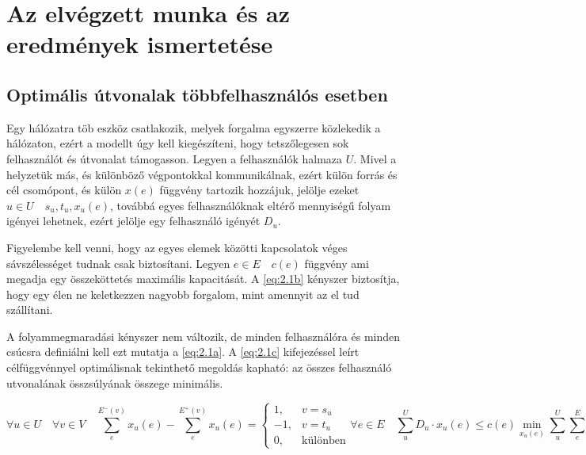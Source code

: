 \documentclass[a4paper,oneside]{article}
\newcommand{\inedge}[1]{E^-(#1)}
\newcommand{\outedge}[1]{E^+(#1)}
\begin{document}
\section{Az elvégzett munka és az eredmények ismertetése}
\label{sec:az-elvegzett-munka}

\subsection{Optimális útvonalak többfelhasználós esetben}
\label{sec:multiuser}

Egy hálózatra töb eszköz csatlakozik, melyek forgalma egyszerre közlekedik a hálózaton, ezért
a modellt úgy kell kiegészíteni, hogy tetszőlegesen sok felhasználót és útvonalat támogasson.
Legyen a felhasználók halmaza $U$.
Mivel a helyzetük más, és különböző végpontokkal kommunikálnak, ezért külön forrás és cél csomópont, 
és külön $x(e)$ függvény tartozik hozzájuk, jelölje ezeket $u \in U \quad s_u, t_u, x_u(e)$,
továbbá egyes felhasználóknak eltérő mennyiségű folyam igényei lehetnek,
ezért jelölje egy felhasználó igényét $D_u$.

Figyelembe kell venni, hogy az egyes elemek közötti kapcsolatok véges sávszélességet tudnak csak biztosítani.
Legyen $e \in E \quad c(e)$ függvény ami megadja egy összeköttetés maximális kapacitását.
A \eqref{eq:2.1b} kényszer biztosítja, hogy egy élen ne keletkezzen nagyobb forgalom, mint amennyit az el tud szállítani.

A folyammegmaradási kényszer nem változik, de minden felhasználóra és minden csúcsra definiálni kell ezt mutatja a \eqref{eq:2.1a}.
A \eqref{eq:2.1c} kifejezéssel leírt célfüggvénnyel optimálisnak tekinthető megoldás kapható:
az összes felhasználó utvonalának összsúlyának összege minimális.

\begin{subequations}
  \begin{equation}
    \forall u \in U \quad \forall v \in V \quad \sum_{e}^{\inedge{v}}x_u(e) - \sum_{e}^{\outedge{v}}x_u(e) = \begin{cases}
      1, & v = s_u \\
      -1, & v = t_u\\
      0, & \text{különben}
    \end{cases} \label{eq:2.1a}
  \end{equation}
  \begin{equation}
    \forall e \in E \quad \sum_{u}^{U} D_u \cdot x_u(e) \leq c(e) \label{eq:2.1b}
  \end{equation}
  \begin{equation}
    \min_{x_u(e)} \sum_{u}^{U} \sum_{e}^{E} x_u(e) \, w(e) \label{eq:2.1c}
  \end{equation}
\end{subequations}
\end{document}
